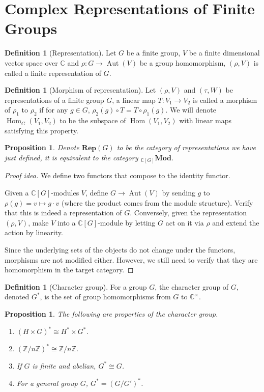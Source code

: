 \documentclass[paper=a4, fontsize=12pt]{scrartcl} %
\newtheorem{prop}[thm]{Proposition}
\theoremstyle{definition}
\newtheorem{defn}[thm]{Definition}
\theoremstyle{remark}
\newcommand{\Z}{\mathbb{Z}}
\newcommand{\C}{\mathbb{C}}
\DeclareMathOperator{\aut}{Aut}
\DeclareMathOperator{\Hom}{Hom}
\begin{document}
\section{Complex Representations of Finite Groups}
\begin{defn}[Representation]
	Let $G$ be a finite group, $V$ be a finite dimensional vector space over $\mathbb{C}$ and $\rho: G \rightarrow \aut(V)$ be a group homomorphism, $(\rho, V)$ is called a finite representation of $G$.
\end{defn}
\begin{defn}[Morphism of representation]
	Let $(\rho, V)$ and $(\tau, W)$ be representations of a finite group $G$, a linear map $T: V_1 \rightarrow V_2$ is called a morphism of $\rho_1$ to $\rho_2$ if for any $g \in G$, $\rho_2(g) \circ T = T \circ \rho_1(g)$. We will denote $\Hom_G(V_1, V_2)$ to be the subspace of $\Hom(V_1, V_2)$ with linear maps satisfying this property.
\end{defn}
\begin{prop}
	Denote $\textbf{Rep}(G)$ to be the category of representations we have just defined, it is equivalent to the category ${}_{\C[G]}\textbf{Mod}$.
\end{prop}
\begin{proof}[Proof idea]
	We define two functors that compose to the identity functor.
	
	Given a $\C[G]$-modules $V$, define $G \rightarrow \aut(V)$ by sending $g$ to $\rho(g) = v \mapsto g \cdot v$ (where the product comes from the module structure). Verify that this is indeed a representation of $G$. Conversely, given the representation $(\rho, V)$, make $V$ into a $\C[G]$-module by letting $G$ act on it via $\rho$ and extend the action by linearity.
	
	Since the underlying sets of the objects do not change under the functors, morphisms are not modified either. However, we still need to verify that they are homomorphism in the target category.
\end{proof}
\begin{defn}[Character group]
	For a group $G$, the character group of $G$, denoted $G^*$, is the set of group homomorphisms from $G$ to $\mathbb{C}^{\times}$.
\end{defn}
\begin{prop}
	The following are properties of the character group.
	\begin{enumerate}
		\item $(H \times G)^{*} \cong H^* \times G^*$.
		\item $(\Z/n\Z)^* \cong \Z/n\Z$.
		\item If $G$ is finite and abelian, $G^* \cong G$.
		\item For a general group $G$, $G^* = (G/G')^*$.
	\end{enumerate}
\end{prop}
\end{document}
